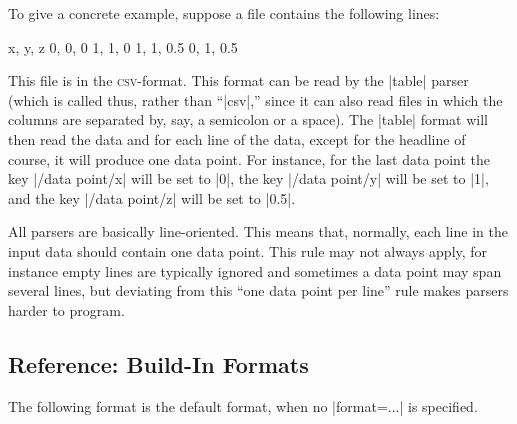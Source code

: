 To give a concrete example, suppose a file contains the following
lines:
\begin{codeexample}
x, y, z
0, 0, 0
1, 1, 0
1, 1, 0.5
0, 1, 0.5
\end{codeexample}
This file is in the \textsc{csv}-format. This format can be read by
the |table| parser (which is called thus, rather than ``|csv|,'' since
it can also read files in which the columns are separated by, say, a
semicolon or a space). The |table| format will then read the data and
for each line of the data, except for the headline of course, it will
produce one data point. For instance, for the last data point the key
|/data point/x| will be set to |0|, the key |/data point/y| will be
set to |1|, and the key |/data point/z| will be set to |0.5|.

All parsers are basically line-oriented. This means that, normally,
each line in the input data should contain one data point. This rule
may not always apply, for instance empty lines are typically ignored
and sometimes a data point may span several lines, but deviating from
this ``one data point per line'' rule makes parsers harder to
program.


\subsection{Reference: Build-In Formats}

The following format is the default format, when no |format=...| is
specified.

